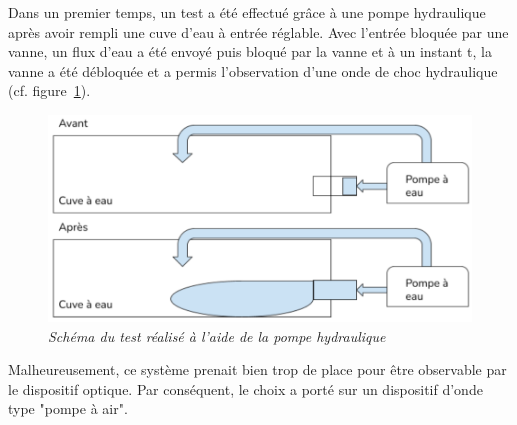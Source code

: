 \subsubsection{}
Dans un premier temps, un test a été effectué grâce à une pompe hydraulique après avoir rempli une cuve d’eau à entrée réglable. Avec l’entrée bloquée par une vanne, un flux d’eau a été envoyé puis bloqué par la vanne et à un instant t, la vanne a été débloquée et a permis l’observation d’une onde de choc hydraulique (cf. figure~\ref{fig:choc_hydro}).
\begin{figure}[H]
	\centering
	\includegraphics[scale = 0.4]{figures/choc_hydro.png}
	\caption{\small{\textit{Schéma du test réalisé à l'aide de la pompe hydraulique}}}
	\label{fig:choc_hydro}
\end{figure}
Malheureusement, ce système prenait bien trop de place pour être observable par le dispositif optique. Par conséquent, le choix a porté sur un dispositif d'onde type "pompe à air".
